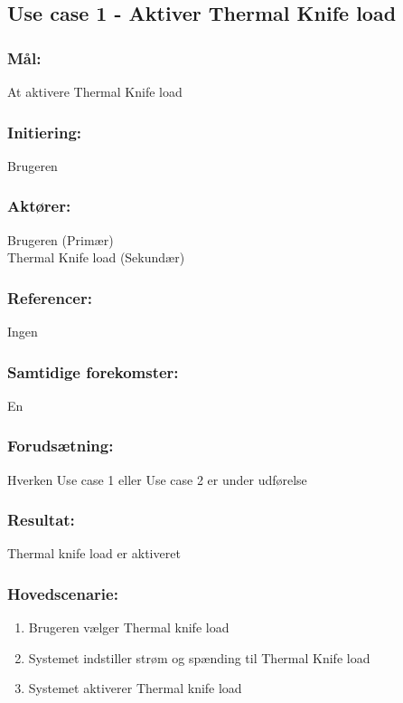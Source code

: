 \begin{framed}
	\subsection{Use case 1 - Aktiver Thermal Knife load}
	\subsubsection*{Mål:}
	At aktivere Thermal Knife load
	
	\subsubsection*{Initiering:}
	Brugeren
	
	\subsubsection*{Aktører:}
	Brugeren (Primær)\\ \indent
	Thermal Knife load (Sekundær)
	
	\subsubsection*{Referencer:}
	Ingen
	
	\subsubsection*{Samtidige forekomster:}
	En
	
	\subsubsection*{Forudsætning:}
	Hverken Use case 1 eller Use case 2 er under udførelse
	
	
	\subsubsection*{Resultat:}
	Thermal knife load er aktiveret
	
	
	\subsubsection*{Hovedscenarie:}
	\begin{enumerate}
		\item Brugeren vælger Thermal knife load
		\item Systemet indstiller strøm og spænding til Thermal Knife load
		\item Systemet aktiverer Thermal knife load
	\end{enumerate}
	
\end{framed}

